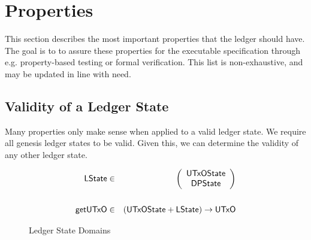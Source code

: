 
\newcommand{\Val}{\fun{Val}}
\newcommand{\POV}[1]{\ensuremath{\mathsf{PresOfVal}(\mathsf{#1})}}
\newcommand{\DBE}[2]{\ensuremath{\mathsf{DBE}({#1},~{#2})}}
\newcommand{\DGO}[2]{\ensuremath{\mathsf{DGO}({#1},~{#2})}}
\renewcommand{\ledgerState}{\LState}

\section{Properties}
\label{sec:properties}
\label{sec:ledger-properties}

This section describes the most important properties that the ledger should have. The goal is to
to assure these properties for the executable specification through e.g.
property-based testing or formal verification.  This list is non-exhaustive, and may be updated
in line with need.

\subsection{Validity of a Ledger State}
\label{sec:valid-ledg-state}

Many properties only make sense when applied to a valid ledger state. We require all genesis ledger states to be valid.
Given this, we can determine the validity of any other ledger state.

\begin{figure}[ht]
  \centering
  \begin{align*}
    \mathsf{LState} & \in & \left(
                         \begin{array}{c}
                           \mathsf{UTxOState} \\
                           \mathsf{DPState}
                         \end{array}
    \right)\\
               && \\
    \mathsf{getUTxO} & \in & ( \mathsf{UTxOState} + \mathsf{LState} ) \to \mathsf{UTxO} \\
  \end{align*}
  \caption{Ledger State Domains}
  \label{fig:valid-ledger}
\end{figure}


